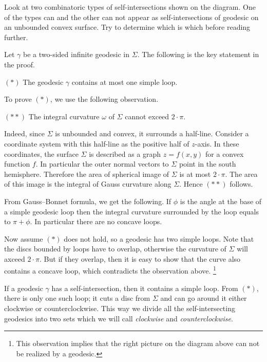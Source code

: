 Look at two combinatoric types of self-intersections shown on the diagram.
One of the types can and the other can not appear as self-intersections of geodesic on an unbounded convex surface.
Try to determine which is which before reading further.

\medskip

Let $\gamma$ be a two-sided infinite geodesic in $\Sigma$.
The following is the key statement in the proof.

\begin{cl}{$({*})$}
The geodesic $\gamma$ contains at most one simple loop.
\end{cl}

To prove $({*})$, we use the following observation.

\begin{cl}{$({*}{*})$}
The integral curvature $\omega$ of $\Sigma$ cannot exceed $2\cdot\pi$.
\end{cl}

Indeed, since $\Sigma$ is unbounded and convex,
it surrounds a half-line.
Consider a coordinate system with this half-line as the positive half of $z$-axis. 
In these coordinates, the surface $\Sigma$ is described as a graph $z=f(x,y)$ for a convex function $f$.
In particular the outer normal vectors to $\Sigma$ point in the south hemisphere.
Therefore the area of spherical image of $\Sigma$ is at most $2\cdot\pi$.
The area of this image is the integral of Gauss curvature along $\Sigma$. 
Hence $({*}{*})$ follows.

From Gauss--Bonnet formula, we get the following.
If $\phi$ is the angle at the base of a simple geodesic loop then the integral curvature surrounded by the loop equals to $\pi+\phi$. 
In particular there are no concave loops.

Now assume $({*})$ does not hold, so a geodesic has two simple loops.
Note that the discs bounded by loops  have to overlap,
otherwise the curvature of $\Sigma$ will axceed $2\cdot\pi$.
But if they overlap, then it is easy to show that the curve also contains a concave loop, 
which contradicts the observation above.%
\footnote{This observation implies that the right picture on the diagram above can not be realized by a geodesic.}

If a geodesic $\gamma$ has a self-intersection,
then it contains a simple loop.
From $({*})$, there is only one such loop;
it cuts a disc from $\Sigma$ 
and can go around it either clockwise or counterclockwise.
This way we divide all the self-intersecting geodesics 
into two sets which we will call {}\emph{clockwise} and {}\emph{counterclockwise}.

